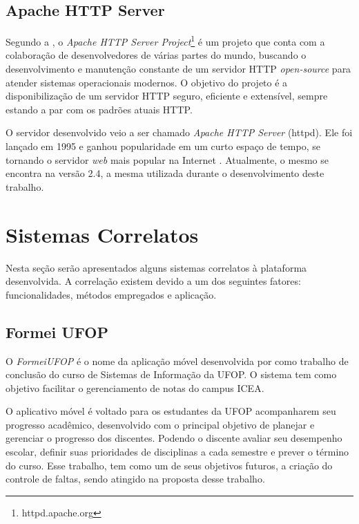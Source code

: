 \documentclass[
  12pt,       %
  openright,      %
  oneside,      %
  a4paper,      %
  english,      %
  french,        %
  spanish,     %
  brazil        %
  ]{abntex2-decsi}
\begin{document}
        \subsection{Apache HTTP Server}

        Segundo a , o \textit{Apache HTTP Server Project}\footnote{httpd.apache.org} é um projeto que conta com a colaboração de desenvolvedores de  várias partes do mundo, buscando o desenvolvimento e manutenção constante de um servidor HTTP \textit{open-source} para atender sistemas operacionais modernos. O objetivo do projeto é a disponibilização de um servidor HTTP seguro, eficiente e extensível, sempre estando a par com os padrões atuais HTTP. 

       O servidor desenvolvido veio a ser chamado \textit{Apache HTTP Server} (httpd). Ele foi lançado em 1995 e ganhou popularidade em um curto espaço de tempo, se tornando o servidor \textit{web} mais popular na Internet \cite{aboutapache:2016}. Atualmente, o mesmo se encontra na versão 2.4, a mesma utilizada durante o desenvolvimento deste trabalho. 

    \section{Sistemas Correlatos}

       Nesta seção serão apresentados alguns sistemas correlatos à plataforma desenvolvida. A correlação existem devido a um dos seguintes fatores: funcionalidades, métodos empregados e aplicação.     
       


        \subsection{Formei UFOP}
        O \textit{FormeiUFOP} é o nome da aplicação móvel desenvolvida por  como trabalho de conclusão do curso de Sistemas de Informação da UFOP. O sistema tem como objetivo facilitar o gerenciamento de notas do campus ICEA. 
        
        O aplicativo móvel é voltado para os estudantes da UFOP acompanharem seu progresso acadêmico, desenvolvido com o principal objetivo de planejar e gerenciar o progresso dos discentes. Podendo o discente avaliar seu desempenho escolar, definir suas prioridades de disciplinas a cada semestre e prever o término do curso. Esse trabalho, tem como um de seus objetivos futuros, a criação do controle de faltas, sendo atingido na proposta desse trabalho.
               
\end{document}
